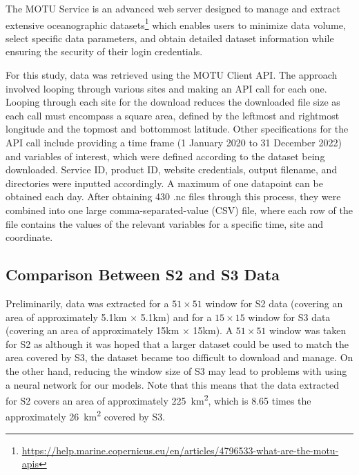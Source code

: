 \documentclass[a4paper,11pt]{report}
\begin{document}
The MOTU Service is an advanced web server designed to manage and extract extensive oceanographic datasets\footnote{\href{https://help.marine.copernicus.eu/en/articles/4796533-what-are-the-motu-apis}{https://help.marine.copernicus.eu/en/articles/4796533-what-are-the-motu-apis}} which enables users to minimize data volume, select specific data parameters, and obtain detailed dataset information while ensuring the security of their login credentials. 

For this study, data was retrieved using the MOTU Client API. The approach involved looping through various sites and making an API call for each one. Looping through each site for the download reduces the downloaded file size as each call must encompass a square area, defined by the leftmost and rightmost longitude and the topmost and bottommost latitude. Other specifications for the API call include providing a time frame (1 January 2020 to 31 December 2022) and variables of interest, which were defined according to the dataset being downloaded. Service ID, product ID, website credentials, output filename, and directories were inputted accordingly. A maximum of one datapoint can be obtained each day. After obtaining 430 .nc files through this process, they were combined into one large comma-separated-value (CSV) file, where each row of the file contains the values of the relevant variables for a specific time, site and coordinate. 

\subsection{Comparison Between S2 and S3 Data}
Preliminarily, data was extracted for a $51 \times 51$ window for S2 data (covering an area of approximately 5.1km $\times$ 5.1km) and for a $15 \times 15$ window for S3 data (covering an area of approximately 15km $\times$ 15km). A $51 \times 51$ window was taken for S2 as although it was hoped that a larger dataset could be used to match the area covered by S3, the dataset became too difficult to download and manage. On the other hand, reducing the window size of S3 may lead to problems with using a neural network for our models. Note that this means that the data extracted for S2 covers an area of approximately \SI{225}{\km\squared}, which is 8.65 times the approximately \SI{26}{\km\squared} covered by S3. 
\end{document}
